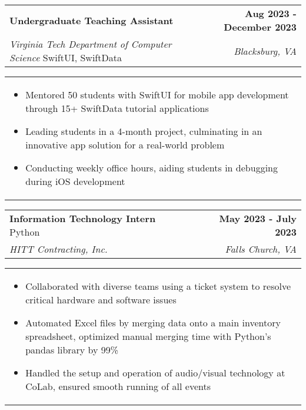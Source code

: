 \documentclass[10pt]{article}
\begin{document}
\noindent \begin{tabularx}{\textwidth}{X r}
\textbf{Undergraduate Teaching Assistant} & \textbf{Aug 2023 - December 2023} \\
\textit{Virginia Tech Department of Computer Science} \textbar{} SwiftUI, SwiftData & \textit{Blacksburg, VA} \\
\end{tabularx}

\vspace{-5pt}

\noindent \begin{tabularx}{\textwidth}{X}
\begin{itemize}[leftmargin=0.75cm, noitemsep, topsep=0pt, parsep=0pt, partopsep=0pt]
\item Mentored 50 students with SwiftUI for mobile app development through 15+ SwiftData tutorial applications
\item Leading students in a 4-month project, culminating in an innovative app solution for a real-world problem
\item Conducting weekly office hours, aiding students in debugging during iOS development
\end{itemize}
\end{tabularx}
\vspace{-5pt}

\vspace{-5pt}

\noindent \begin{tabularx}{\textwidth}{X r}
\textbf{Information Technology Intern} \textbar{} Python  & \textbf{May 2023 - July 2023} \\
\textit{HITT Contracting, Inc.} & \textit{Falls Church, VA} \\
\end{tabularx}

\vspace{-5pt}

\noindent \begin{tabularx}{\textwidth}{X}
\begin{itemize}[leftmargin=0.75cm, noitemsep, topsep=0pt, parsep=0pt, partopsep=0pt]
\item Collaborated with diverse teams using a ticket system to resolve critical hardware and software issues
\item Automated Excel files by merging data onto a main inventory spreadsheet, optimized manual merging time with Python's pandas library by 99\%
\item Handled the setup and operation of audio/visual technology at Co\textbar{}Lab, ensured smooth running of all events
\end{itemize}
\end{tabularx}
\end{document}
